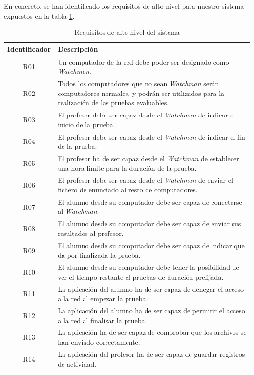 En concreto, se han identificado los requisitos de alto nivel para nuestro sistema expuestos en la tabla \ref{tabla:requisitos}.


\begin{table}
\begin{tabular}{|c|p{10cm}|}
	\hline
	\textbf{Identificador} & \textbf{Descripción}
	\\ \hline

	R01 & Un computador de la red debe poder ser designado como \emph{Watchman}.
	\\ \hline

	R02 & Todos los computadores que no sean \emph{Watchman} serán computadores
	normales, y podrán ser utilizados para la realización de las pruebas evaluables.
	\\ \hline

	R03 & El profesor debe ser capaz desde el \emph{Watchman} de indicar el inicio de la prueba.
	\\ \hline

	R04 & El profesor debe ser capaz desde el \emph{Watchman} de indicar el fin de la prueba.
	\\ \hline

	R05 & El profesor ha de ser capaz desde el \emph{Watchman} de establecer una hora límite para la duración de la prueba.
	\\ \hline

	R06 & El profesor debe ser capaz desde el \emph{Watchman} de enviar el fichero de enunciado al resto de computadores.
	\\ \hline

	R07 & El alumno desde su computador debe ser capaz de conectarse al \emph{Watchman}.
	\\ \hline

	R08 & El alumno desde su computador debe ser capaz de enviar sus resultados al profesor.
	\\ \hline

	R09 & El alumno desde su computador debe ser capaz de indicar que da por finalizada la prueba.
	\\ \hline

	R10 & El alumno desde su computador debe tener la posibilidad de ver el tiempo restante el pruebas de duración prefijada.
	\\ \hline

	R11 & La aplicación del alumno ha de ser capaz de denegar el acceso a la red al empezar la prueba.
	\\ \hline

	R12 & La aplicación del alumno ha de ser capaz de permitir el acceso a la red al finalizar la prueba.
	\\ \hline

	R13 & La aplicación ha de ser capaz de comprobar que los archivos se han enviado correctamente.
	\\ \hline

	R14 & La aplicación del profesor ha de ser capaz de guardar registros de actividad.
	\\ \hline

\end{tabular}
\caption{Requisitos de alto nivel del sistema}
\label{tabla:requisitos}
\end{table}

